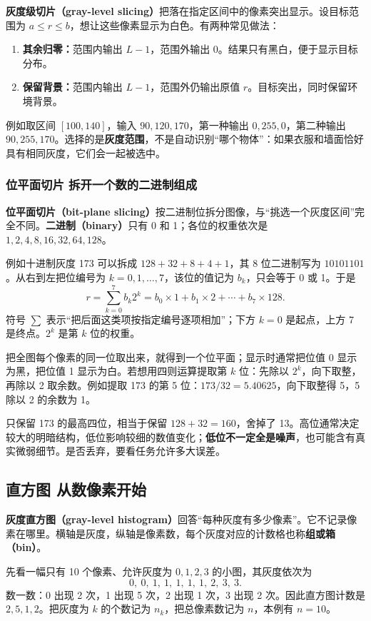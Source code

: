 \textbf{灰度级切片（gray-level slicing）}把落在指定区间中的像素突出显示。设目标范围为 $a\le r\le b$，想让这些像素显示为白色。有两种常见做法：
\begin{enumerate}[leftmargin=*]
\item \textbf{其余归零：}范围内输出 $L-1$，范围外输出 0。结果只有黑白，便于显示目标分布。
\item \textbf{保留背景：}范围内输出 $L-1$，范围外仍输出原值 $r$。目标突出，同时保留环境背景。
\end{enumerate}
例如取区间 $[100,140]$，输入 $90,120,170$，第一种输出 $0,255,0$，第二种输出 $90,255,170$。选择的是\textbf{灰度范围}，不是自动识别“哪个物体”：如果衣服和墙面恰好具有相同灰度，它们会一起被选中。

\subsubsection*{位平面切片 拆开一个数的二进制组成}

\textbf{位平面切片（bit-plane slicing）}按二进制位拆分图像，与“挑选一个灰度区间”完全不同。\textbf{二进制（binary）}只有 0 和 1；各位的权重依次是 $1,2,4,8,16,32,64,128$。

例如十进制灰度 173 可以拆成 $128+32+8+4+1$，其 8 位二进制写为 $10101101$。从右到左把位编号为 $k=0,1,\ldots,7$，该位的值记为 $b_k$，只会等于 0 或 1。于是
\[
r=\sum_{k=0}^{7}b_k2^k
=b_0\!\times1+b_1\!\times2+\cdots+b_7\!\times128.
\]
符号 $\sum$ 表示“把后面这类项按指定编号逐项相加”；下方 $k=0$ 是起点，上方 7 是终点。$2^k$ 是第 $k$ 位的权重。

把全图每个像素的同一位取出来，就得到一个位平面；显示时通常把位值 0 显示为黑，把位值 1 显示为白。若想用四则运算提取第 $k$ 位：先除以 $2^k$，向下取整，再除以 2 取余数。例如提取 173 的第 5 位：$173/32=5.40625$，向下取整得 5，5 除以 2 的余数为 1。

只保留 173 的最高四位，相当于保留 $128+32=160$，舍掉了 13。高位通常决定较大的明暗结构，低位影响较细的数值变化；\textbf{低位不一定全是噪声}，也可能含有真实微弱细节。是否丢弃，要看任务允许多大误差。

\subsection{直方图 从数像素开始}

\textbf{灰度直方图（gray-level histogram）}回答“每种灰度有多少像素”。它不记录像素在哪里。横轴是灰度，纵轴是像素数，每个灰度对应的计数格也称\textbf{组或箱（bin）}。

先看一幅只有 10 个像素、允许灰度为 $0,1,2,3$ 的小图，其灰度依次为
\[
0,\ 0,\ 1,\ 1,\ 1,\ 1,\ 1,\ 2,\ 3,\ 3.
\]
数一数：0 出现 2 次，1 出现 5 次，2 出现 1 次，3 出现 2 次。因此直方图计数是 $2,5,1,2$。把灰度为 $k$ 的个数记为 $n_k$，把总像素数记为 $n$，本例有 $n=10$。

